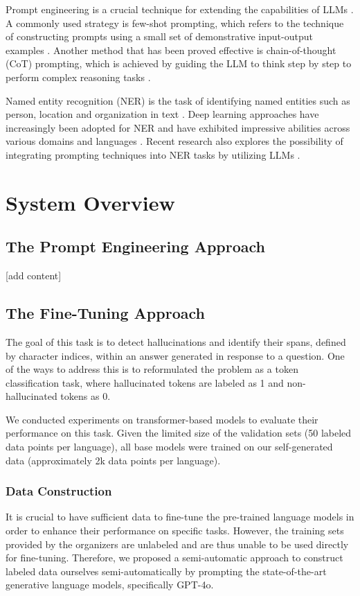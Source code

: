 \documentclass[11pt]{article}
\begin{document}
Prompt engineering is a crucial technique for extending the capabilities of LLMs \cite{sahoo2024systematic}. A commonly used strategy is few-shot prompting, which refers to the technique of constructing prompts using a small set of demonstrative input-output examples \cite{lazaridou2022internet, ma2023fairness}. Another method that has been proved effective is chain-of-thought (CoT) prompting, which is achieved by guiding the LLM to think step by step to perform complex reasoning tasks \cite{wei2022chain, zhang2022automatic, chen2023you}.

Named entity recognition (NER) is the task of identifying named entities such as person, location and organization in text \cite{yadav2019survey}. Deep learning approaches have increasingly been adopted for NER and have exhibited impressive abilities across various domains and languages \cite{li2020survey, song2021deep, liu2022chinese}. Recent research also explores the possibility of integrating prompting techniques into NER tasks by utilizing LLMs \cite{shen2023promptner, hu2024improving}.

\section{System Overview}
\subsection{The Prompt Engineering Approach}
[add content]

\subsection{The Fine-Tuning Approach}
The goal of this task is to detect hallucinations and identify their spans, defined by character indices, within an answer generated in response to a question. One of the ways to address this is to reformulated the problem as a token classification task, where hallucinated tokens are labeled as 1 and non-hallucinated tokens as 0.

We conducted experiments on transformer-based models to evaluate their performance on this task. Given the limited size of the validation sets (50 labeled data points per language), all base models were trained on our self-generated data (approximately 2k data points per language).

\subsubsection{Data Construction}
It is crucial to have sufficient data to fine-tune the pre-trained language models in order to enhance their performance on specific tasks. However, the training sets provided by the organizers are unlabeled and are thus unable to be used directly for fine-tuning. Therefore, we proposed a semi-automatic approach to construct labeled data ourselves semi-automatically by prompting the state-of-the-art generative language models, specifically GPT-4o.
\end{document}
